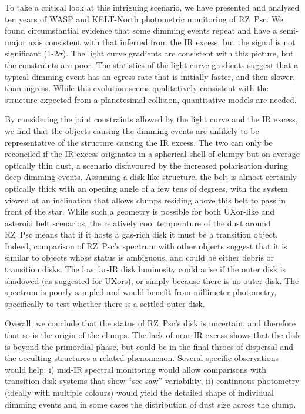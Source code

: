 \documentclass[]{rsos}
\begin{document}
To take a critical look at this intriguing scenario, we have presented and analysed ten
years of WASP and KELT-North photometric monitoring of RZ~Psc. We found circumstantial
evidence that some dimming events repeat and have a semi-major axis consistent with that
inferred from the IR excess, but the signal is not significant (1-2$\sigma$). The light
curve gradients are consistent with this picture, but the constraints are poor. The
statistics of the light curve gradients suggest that a typical dimming event has an
egress rate that is initially faster, and then slower, than ingress. While this evolution
seems qualitatively consistent with the structure expected from a planetesimal collision,
quantitative models are needed.

By considering the joint constraints allowed by the light curve and the IR excess, we
find that the objects causing the dimming events are unlikely to be representative of the
structure causing the IR excess. The two can only be reconciled if the IR excess
originates in a spherical shell of clumpy but on average optically thin dust, a scenario
disfavoured by the increased polarisation during deep dimming events. Assuming a
disk-like structure, the belt is almost certainly optically thick with an opening angle
of a few tens of degrees, with the system viewed at an inclination that allows clumps
residing above this belt to pass in front of the star. While such a geometry is possible
for both UXor-like and asteroid belt scenarios, the relatively cool temperature of the
dust around RZ~Psc means that if it hosts a gas-rich disk it must be a transition
object. Indeed, comparison of RZ~Psc's spectrum with other objects suggest that it is
similar to objects whose status is ambiguous, and could be either debris or transition
disks. The low far-IR disk luminosity could arise if the outer disk is shadowed (as
suggested for UXors), or simply because there is no outer disk. The spectrum is poorly
sampled and would benefit from millimeter photometry, specifically to test whether there
is a settled outer disk.

Overall, we conclude that the status of RZ~Psc's disk is uncertain, and therefore that so
is the origin of the clumps. The lack of near-IR excess shows that the disk is beyond the
primordial phase, but could be in the final throes of dispersal and the occulting
structures a related phenomenon. Several specific observations would help: i) mid-IR
spectral monitoring would allow comparisons with transition disk systems that show
``see-saw'' variability, ii) continuous photometry (ideally with multiple colours) would
yield the detailed shape of individual dimming events and in some cases the distribution
of dust size across the clump.
\end{document}
